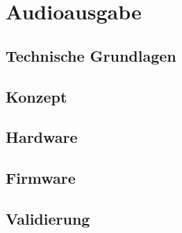 \chapter{Audioausgabe}
\thispagestyle{fancy}  
\section{Technische Grundlagen}
\section{Konzept}
\section{Hardware}
\section{Firmware}
\section{Validierung}